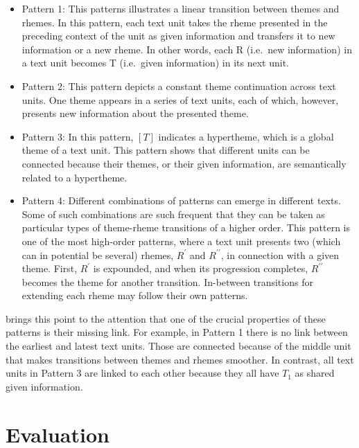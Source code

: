 \begin{itemize}
\item Pattern 1: This patterns illustrates a linear transition between themes and rhemes. 
In this pattern, each text unit takes the rheme presented in the preceding context of the unit as given information and transfers it to new information or a new rheme. 
In other words, each R (i.e.\ new information) in a text unit becomes T (i.e.\ given information) in its next unit.  


\item Pattern 2: 
This pattern depicts a constant theme continuation across text units.  
One theme appears in a series of text units, each of which, however, presents new information about the presented theme. 


\item Pattern 3: 
In this pattern, $[T]$ indicates a hypertheme, which is a global theme of a text unit.  
This pattern shows that different units can be connected because their themes, or their given information, are semantically related to a hypertheme. 

\item Pattern 4: 
Different combinations of patterns can emerge in different texts. 
Some of such combinations are such frequent that they can be taken as particular types of \mbox{theme-rheme} transitions of a higher order. 
This pattern is one of the most high-order patterns, where a text unit presents two (which can in potential be several) rhemes, $R^\prime$ and $R^{\prime\prime}$, in connection with a given theme. 
First, $R^{\prime}$ is expounded, and when its progression completes, $R^{\prime\prime}$ becomes the theme for another transition. 
 In-between transitions for extending each rheme may follow their own patterns. 
\end{itemize}

 brings this point to the attention that one of the crucial properties of these patterns is their missing link.   
For example, in Pattern 1 there is no link between the earliest and latest text units. 
Those are connected because of the middle unit that makes transitions between themes and rhemes smoother. 
In contrast, all text units in Pattern 3  are linked to each other because they all have $T_1$ as shared given information. 

\section{Evaluation}
\label{sec:coh-eval}

